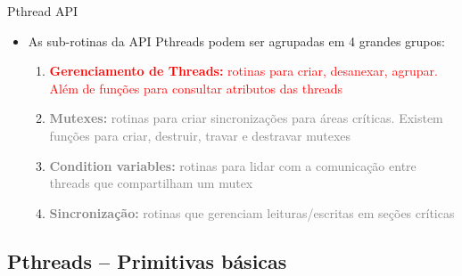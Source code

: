 \documentclass[10pt, xcolor=x11names]{beamer}
\begin{document}
\begin{frame}
	\begin{block}{Pthread API}
		\begin{itemize}
			\item<1-> As sub-rotinas da API Pthreads podem ser agrupadas em 4 grandes grupos:
				\begin{enumerate}
					\item<1-> \textcolor<5->{red}{\textbf{Gerenciamento de Threads:} rotinas para criar, desanexar, agrupar. Além de funções para consultar atributos das threads}	

					\item<2-> \textcolor<5->{gray}{\textbf{Mutexes:} rotinas para criar sincronizações para áreas críticas. Existem funções para criar, destruir, travar e destravar mutexes}

					\item<3-> \textcolor<5->{gray}{\textbf{Condition variables:} rotinas para lidar com a comunicação entre threads que compartilham um mutex}

					\item<4-> \textcolor<5->{gray}{\textbf{Sincronização:} rotinas que gerenciam leituras/escritas em seções críticas}
				\end{enumerate}
			
		\end{itemize}
	\end{block}
\end{frame}

\subsection{Pthreads -- Primitivas básicas} %
\end{document}
